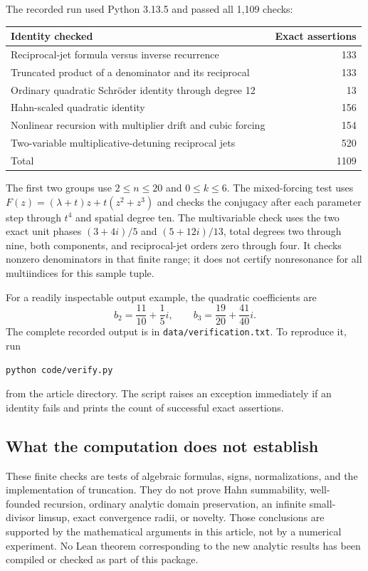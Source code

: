\documentclass[11pt,a4paper]{article}
\numberwithin{equation}{section}
\theoremstyle{definition}
\theoremstyle{remark}
\begin{document}
The recorded run used Python 3.13.5 and passed all 1,109 checks:
\begin{center}
\begin{tabular}{@{}lr@{}}
\toprule
Identity checked & Exact assertions\\
\midrule
Reciprocal-jet formula versus inverse recurrence &133\\
Truncated product of a denominator and its reciprocal &133\\
Ordinary quadratic Schr\"oder identity through degree 12 &13\\
Hahn-scaled quadratic identity &156\\
Nonlinear recursion with multiplier drift and cubic forcing &154\\
Two-variable multiplicative-detuning reciprocal jets &520\\
\midrule
Total &1109\\
\bottomrule
\end{tabular}
\end{center}
The first two groups use $2\le n\le20$ and $0\le k\le6$.
The mixed-forcing test uses
$F(z)=(\lambda+t)z+t(z^2+z^3)$ and checks the conjugacy after each
parameter step through $t^4$ and spatial degree ten. The multivariable
check uses the two exact unit phases
$(3+4i)/5$ and $(5+12i)/13$, total degrees two through nine, both components,
and reciprocal-jet orders zero through four. It checks nonzero
denominators in that finite range; it does not certify nonresonance for
all multiindices for this sample tuple.

For a readily inspectable output example, the quadratic coefficients are
\[
 b_2=\frac{11}{10}+\frac15 i,
 \qquad b_3=\frac{19}{20}+\frac{41}{40}i.
\]
The complete recorded output is in \texttt{data/verification.txt}.
To reproduce it, run
\begin{verbatim}
python code/verify.py
\end{verbatim}
from the article directory. The script raises an exception immediately if
an identity fails and prints the count of successful exact assertions.

\subsection{What the computation does not establish}

These finite checks are tests of algebraic formulas, signs, normalizations,
and the implementation of truncation. They do not prove Hahn summability,
well-founded recursion, ordinary analytic domain preservation, an infinite
small-divisor limsup, exact convergence radii, or novelty. Those conclusions
are supported by the mathematical arguments in this article, not by a
numerical experiment. No Lean theorem corresponding to the new analytic
results has been compiled or checked as part of this package.
\end{document}
